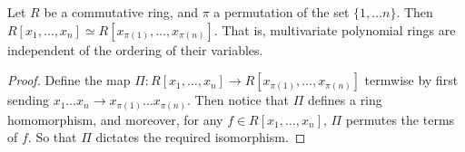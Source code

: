\begin{lemma}\label{lemma_6.1.3}
  Let $R$ be a commutative ring, and  $\pi$ a permutation of the set  $\{1,
  \dots n\}$. Then $R[x_1, \dots, x_n] \simeq R[x_{\pi(1)}, \dots,
  x_{\pi(n)}]$. That is, multivariate polynomial rings are independent of the
  ordering of their variables.
\end{lemma}
\begin{proof}
  Define the map $\Pi:R[x_1, \dots, x_n] \xrightarrow{} R[x_{\pi(1)}, \dots,
  x_{\pi(n)}]$ termwise by first sending $x_1 \dots x_n \xrightarrow{}
  x_{\pi(1)} \dots x_{\pi(n)}$. Then notice that $\Pi$ defines a ring
  homomorphism, and moreover, for any  $f \in R[x_1, \dots, x_n]$, $\Pi$
  permutes the terms of $f$. So that  $\Pi$ dictates the required isomorphism.
\end{proof}




